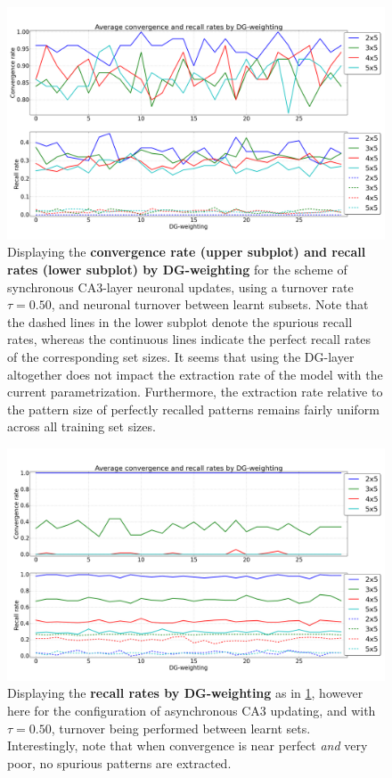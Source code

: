 \begin{figure}
    \centering
    \includegraphics[width=13cm]{fig/DGWs/sync_tm0_50}
    \caption{Displaying the \textbf{convergence rate (upper subplot) and recall rates (lower subplot) by DG-weighting} for the scheme of synchronous CA3-layer neuronal updates, using a turnover rate $\tau=0.50$, and neuronal turnover between learnt subsets. Note that the dashed lines in the lower subplot denote the spurious recall rates, whereas the continuous lines indicate the perfect recall rates of the corresponding set sizes. It seems that using the DG-layer altogether does not impact the extraction rate of the model with the current parametrization. Furthermore, the extraction rate relative to the pattern size of perfectly recalled patterns remains fairly uniform across all training set sizes.}
    \label{fig:sync_tm0_50}
\end{figure}

\begin{figure}
    \centering
    \includegraphics[width=13cm]{fig/DGWs/async_tm0_50}
    \caption{Displaying the \textbf{recall rates by DG-weighting} as in \ref{fig:sync_tm0_50}, however here for the configuration of asynchronous CA3 updating, and with $\tau=0.50$, turnover being performed between learnt sets. Interestingly, note that when convergence is near perfect \textit{and} very poor, no spurious patterns are extracted.}
    \label{fig:async_tm0_50}
\end{figure}

